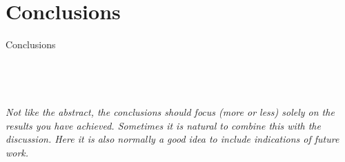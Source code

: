 \section{Conclusions}
Conclusions
\\\\\\\\
\noindent
\textit{\color{red}\\
Not like the abstract, the conclusions should focus (more or less) solely on the results you have achieved. Sometimes it is natural to combine this with the discussion.  Here it is also normally a good idea to include indications of future work.}\\
\clearpage

